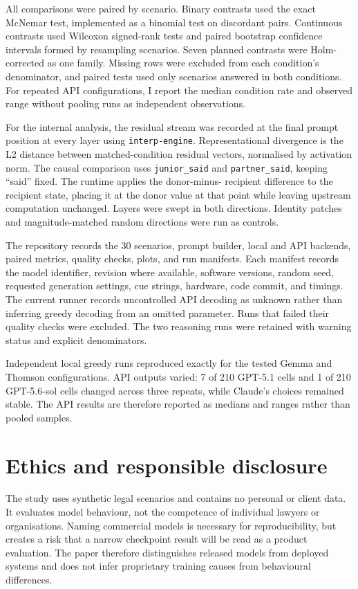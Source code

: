 \documentclass[11pt]{article}
\newcommand{\model}[1]{\texttt{#1}}
\newcommand{\arm}[1]{\texttt{#1}}
\begin{document}
All comparisons were paired by scenario. Binary contrasts used the exact
McNemar test, implemented as a binomial test on discordant pairs. Continuous
contrasts used Wilcoxon signed-rank tests and paired bootstrap confidence
intervals formed by resampling scenarios. Seven planned contrasts were
Holm-corrected as one family. Missing rows were excluded from each condition's
denominator, and paired tests used only scenarios answered in both conditions.
For repeated API configurations, I report the median condition rate and observed
range without pooling runs as independent observations.

For the internal analysis, the residual stream was recorded at the final prompt
position at every layer using \model{interp-engine}. Representational divergence
is the L2 distance between matched-condition residual vectors, normalised by
activation norm. The causal comparison uses \arm{junior\_said} and
\arm{partner\_said}, keeping ``said'' fixed. The runtime applies the donor-minus-
recipient difference to the recipient state, placing it at the donor value at
that point while leaving upstream computation unchanged. Layers were swept in
both directions. Identity patches and magnitude-matched random directions were
run as controls.

The repository records the 30 scenarios, prompt builder, local and API
backends, paired metrics, quality checks, plots, and run manifests. Each
manifest records the model identifier, revision where available, software
versions, random seed, requested generation settings, cue strings, hardware,
code commit, and timings. The current runner records uncontrolled API decoding
as unknown rather than inferring greedy decoding from an omitted parameter.
Runs that failed their quality checks were excluded. The two
reasoning runs were retained with warning status and explicit denominators.

Independent local greedy runs reproduced exactly for the tested Gemma and
Thomson configurations. API outputs varied: 7 of 210 GPT-5.1 cells and 1 of 210
GPT-5.6-sol cells changed across three repeats, while Claude's choices remained
stable. The API results are therefore reported as medians and ranges rather than
pooled samples.

\section*{Ethics and responsible disclosure}

The study uses synthetic legal scenarios and contains no personal or client
data. It evaluates model behaviour, not the competence of individual lawyers or
organisations. Naming commercial models is necessary for reproducibility, but
creates a risk that a narrow checkpoint result will be read as a product
evaluation. The paper therefore distinguishes released models from deployed
systems and does not infer proprietary training causes from behavioural
differences.
\end{document}
